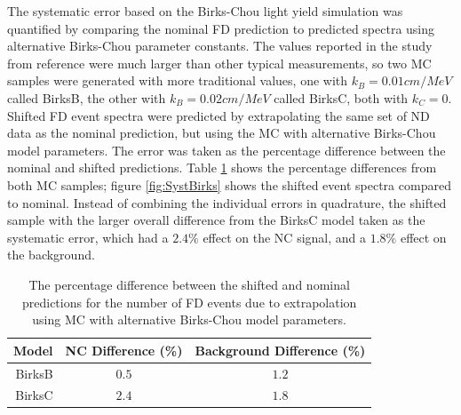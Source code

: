 The systematic error based on the Birks-Chou light yield simulation was quantified by comparing the nominal FD prediction to predicted spectra using alternative Birks-Chou parameter constants. The values reported in the study from reference \cite{ref:DanBirks} were much larger than other typical measurements, so two MC samples were generated with more traditional values, one with $k_B = 0.01\unit{cm/MeV}$ called BirksB, the other with $k_B = 0.02\unit{cm/MeV}$ called BirksC, both with $k_C = 0$. Shifted FD event spectra were predicted by extrapolating the same set of ND data as the nominal prediction, but using the MC with alternative Birks-Chou model parameters. The error was taken as the percentage difference between the nominal and shifted predictions. Table \ref{tab:SystBirks} shows the percentage differences from both MC samples; figure \ref{fig:SystBirks} shows the shifted event spectra compared to nominal. Instead of combining the individual errors in quadrature, the shifted sample with the larger overall difference from the BirksC model taken as the systematic error, which had a $2.4\%$ effect on the NC signal, and a $1.8\%$ effect on the background.
\begin{table}[htb]
  \begin{center}
    \begin{tabular}{r c c}
      \hline\hline
      Model & NC Difference (\%) & Background Difference (\%) \\
      \hline
      BirksB & $0.5$ & $1.2$ \\
      BirksC & $2.4$ & $1.8$ \\
      \hline
    \end{tabular}
    \caption[Birks-Chou Systematic Errors]{The percentage difference between the shifted and nominal predictions for the number of FD events due to extrapolation using MC with alternative Birks-Chou model parameters.}
    \label{tab:SystBirks}
  \end{center}
\end{table}

